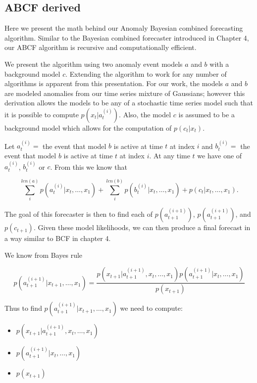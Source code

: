 \subsection{ABCF derived}
\label{sec:abcf}
Here we present the math behind our Anomaly Bayesian combined forecasting algorithm.  Similar to the Bayesian combined forecaster introduced in Chapter 4, our ABCF algorithm is recursive and computationally efficient.  

We present the algorithm using two anomaly event models $a$ and $b$ with a background model $c$.  Extending the algorithm to work for any number of algorithms is apparent from this presentation.  For our work, the models $a$ and $b$ are modeled anomalies from our time series mixture of Gaussians; however this derivation allows the models to be any of a stochastic time series model such that it is possible to compute $p(x_{t} | a^{(i)}_{t})$.  Also, the model $c$ is assumed to be a background model which allows for the computation of $p(c_{t}|x_{t})$.  

Let $a_{t}^{(i)} = $ the event that model $b$ is active at time $t$ at index $i$ and $b_{t}^{(i)} = $ the event that model $b$ is active at time $t$ at index $i$.  At any time $t$ we have one of ${a^{(i)}_{t}}$, ${b^{(i)}_{t}}$ or $c$.  From this we know that 

\begin{equation}
\sum_{i}^{len(a)} p(a_{t}^{(i)}|x_{t}, \ldots, x_{1}) + \sum_{i}^{len(b)} p(b_{t}^{(i)}|x_{t}, \ldots, x_{1}) + p(c_{t}|x_{t}, \ldots, x_{1}).
\end{equation}

The goal of this forecaster is then to find each of $p(a_{t + 1}^{(i + 1)})$, $p(a_{t + 1}^{(i + 1)})$, and $p(c_{t + 1}).$  Given these model likelihoods, we can then produce a final forecast in a way similar to BCF in chapter 4.

We know from Bayes rule 

\begin {equation}
p(a_{t + 1}^{(i + 1)}|x_{t + 1}, \ldots, x_{1}) =
		\frac{p(x_{t + 1}|a^{(i + 1)}_{t + 1}, x_{t}, \ldots, x_{1}) p(a_{t + 1}^{(i + 1)}|x_{t}, \ldots, x_{1})}
	       {p(x_{t + 1})}
\end{equation}

Thus to find $p(a_{t + 1}^{(i + 1)}|x_{t + 1}, \ldots, x_{1})$ we need to compute:
\begin{itemize}
	\item $p(x_{t + 1}|a^{(i + 1)}_{t + 1}, x_{t}, \ldots, x_{1})$
	\item $p(a_{t + 1}^{(i + 1)}|x_{t}, \ldots, x_{1})$
	\item $p(x_{t + 1})$
\end{itemize} 

